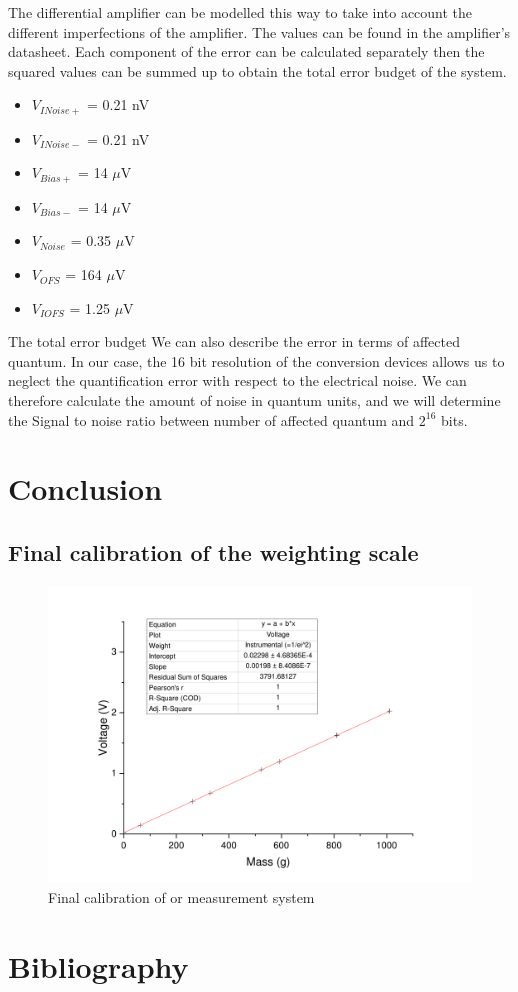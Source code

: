 \documentclass{article}[12pt]
\begin{document}
The differential amplifier can be modelled this way to take into account the different imperfections of the amplifier.
The values can be found in the amplifier's datasheet.
Each component of the error can be calculated separately then the squared values can be summed up to obtain the total error budget of the system.
\begin{itemize}
    \item $V_{INoise+}$ = 0.21 nV
    \item $V_{INoise-}$ = 0.21 nV
    \item $V_{Bias+}$ = 14 $\mu$V
    \item $V_{Bias-}$ = 14 $\mu$V
    \item $V_{Noise}$ = 0.35 $\mu$V
    \item $V_{OFS}$ = 164 $\mu$V
    \item $V_{IOFS}$ = 1.25 $\mu$V
\end{itemize}
The total error budget
We can also describe the error in terms of affected quantum. In our case, the 16 bit resolution of the conversion devices allows us to neglect the quantification error with respect to the electrical noise. We can therefore calculate the amount of noise in quantum units, and we will determine the Signal to noise ratio between number of affected quantum and $2^{16}$ bits.
\section{Conclusion}
\subsection{Final calibration of the weighting scale}
\paragraph{}
\begin{figure}[H]
    \centering
    \includegraphics[width=.8\textwidth]{figures/calibr.pdf}
    \caption{Final calibration of or measurement system}
    \label{fig:final_calibration}
\end{figure}

\newpage
\section{Bibliography}


\end{document}
